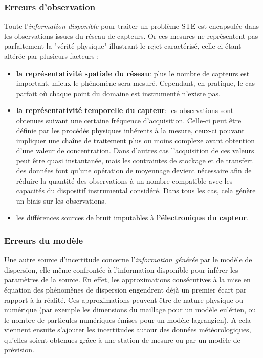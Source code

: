 	
	\subsubsection{Erreurs d'observation}
	Toute l'\textit{information disponible} pour traiter un problème STE est encapsulée dans les observations issues du réseau de capteurs. Or ces mesures ne représentent pas parfaitement la "vérité physique" illustrant le rejet caractérisé, celle-ci étant altérée par plusieurs facteurs : \\
	
	\begin{itemize}
		\item \textbf{la représentativité spatiale du réseau}: plus le nombre de capteurs est important, mieux le phénomène sera mesuré. Cependant, en pratique, le cas parfait où chaque point du domaine est instrumenté n'existe pas.
		\item \textbf{la représentativité temporelle du capteur}: les observations sont obtenues suivant une certaine fréquence d'acquisition. Celle-ci peut être définie par les procédés physiques inhérents à la mesure, ceux-ci pouvant impliquer une chaîne de traitement plus ou moins complexe avant obtention d'une valeur de concentration. Dans d'autres cas l'acquisition de ces valeurs peut être quasi instantanée, mais les contraintes de stockage et de transfert des données font qu'une opération de moyennage devient nécessaire afin de réduire la quantité des observations à un nombre compatible avec les capacités du dispositif instrumental considéré. Dans tous les cas, cela génère un biais sur les observations.
		\item les différences sources de bruit imputables à \textbf{l'électronique du capteur}.\\
	\end{itemize}
	
	\subsubsection{Erreurs du modèle}
	Une autre source d'incertitude concerne l'\textit{information générée} par le modèle de dispersion, elle-même confrontée à l'information disponible pour inférer les paramètres de la source. En effet, les approximations consécutives à la mise en équation des phénomènes de dispersion engendrent déjà un premier écart par rapport à la réalité. Ces approximations peuvent être de nature physique ou numérique (par exemple les dimensions du maillage pour un modèle eulérien, ou le nombre de particules numériques émises pour un modèle lagrangien). A cela viennent ensuite s'ajouter les incertitudes autour des données météorologiques, qu'elles soient obtenues grâce à une station de mesure ou par un modèle de prévision. \\
	
